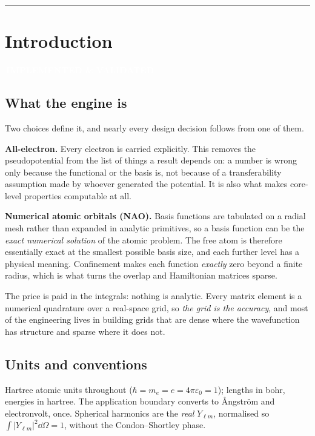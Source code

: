 \documentclass[11pt,a4paper]{article}
\newcommand{\badge}[2]{%
  \par\vspace{2pt}\noindent
  \colorbox{#1}{\textcolor{white}{\small\bfseries\,#2\,}}\par\vspace{4pt}}
\newcommand{\implemented}{\badge{okgreen}{IMPLEMENTED \& VALIDATED}}
\begin{document}
\tableofcontents
\bigskip
\hrule

\section{Introduction}
\implemented

\subsection{What the engine is}

Two choices define it, and nearly every design decision follows from one of
them.

\textbf{All-electron.} Every electron is carried explicitly. This removes the
pseudopotential from the list of things a result depends on: a number is wrong
only because the functional or the basis is, not because of a transferability
assumption made by whoever generated the potential. It is also what makes
core-level properties computable at all.

\textbf{Numerical atomic orbitals (NAO).} Basis functions are tabulated on a
radial mesh rather than expanded in analytic primitives, so a basis function
can be the \emph{exact numerical solution} of the atomic problem. The free
atom is therefore essentially exact at the smallest possible basis size, and
each further level has a physical meaning. Confinement makes each function
\emph{exactly} zero beyond a finite radius, which is what turns the overlap
and Hamiltonian matrices sparse.

The price is paid in the integrals: nothing is analytic. Every matrix element
is a numerical quadrature over a real-space grid, so \emph{the grid is the
accuracy}, and most of the engineering lives in building grids that are dense
where the wavefunction has structure and sparse where it does not.

\subsection{Units and conventions}

Hartree atomic units throughout ($\hbar = m_e = e = 4\pi\varepsilon_0 = 1$);
lengths in bohr, energies in hartree. The application boundary converts to
{\AA}ngstr\"om and electronvolt, once. Spherical harmonics are the
\emph{real} $Y_{\ell m}$, normalised so $\int |Y_{\ell m}|^2 \dd\Omega = 1$,
without the Condon--Shortley phase.
\end{document}
